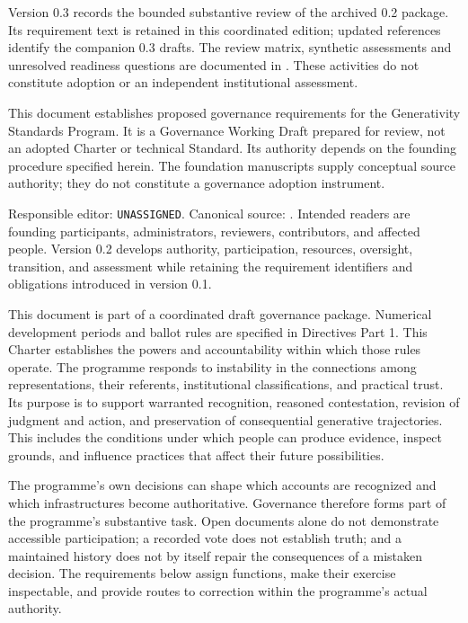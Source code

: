 \documentclass[11pt,a4paper]{article}
\begin{document}
\GSPfrontmatter
{}
Version 0.3 records the bounded substantive review of the archived 0.2 package. Its requirement text is retained in this coordinated edition; updated references identify the companion 0.3 drafts. The review matrix, synthetic assessments and unresolved readiness questions are documented in . These activities do not constitute adoption or an independent institutional assessment.

This document establishes proposed governance requirements for the Generativity Standards Program. It is a Governance Working Draft prepared for review, not an adopted Charter or technical Standard. Its authority depends on the founding procedure specified herein. The foundation manuscripts supply conceptual source authority; they do not constitute a governance adoption instrument.

Responsible editor: \texttt{UNASSIGNED}. Canonical source: . Intended readers are founding participants, administrators, reviewers, contributors, and affected people. Version 0.2 develops authority, participation, resources, oversight, transition, and assessment while retaining the requirement identifiers and obligations introduced in version 0.1.

This document is part of a coordinated draft governance package. Numerical development periods and ballot rules are specified in Directives Part 1. This Charter establishes the powers and accountability within which those rules operate.
\tableofcontents
\clearpage
{}
The programme responds to instability in the connections among representations, their referents, institutional classifications, and practical trust. Its purpose is to support warranted recognition, reasoned contestation, revision of judgment and action, and preservation of consequential generative trajectories. This includes the conditions under which people can produce evidence, inspect grounds, and influence practices that affect their future possibilities.

The programme's own decisions can shape which accounts are recognized and which infrastructures become authoritative. Governance therefore forms part of the programme's substantive task. Open documents alone do not demonstrate accessible participation; a recorded vote does not establish truth; and a maintained history does not by itself repair the consequences of a mistaken decision. The requirements below assign functions, make their exercise inspectable, and provide routes to correction within the programme's actual authority.
\end{document}
